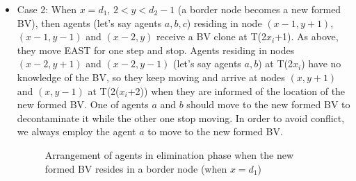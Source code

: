 \begin{itemize}
\item Case 2: When $x=d_1$, $2<y<d_2-1$ (a border node becomes a new formed BV), then agents (let's say agents $a,b,c$) residing in node $(x-1, y+1)$, $(x-1, y-1)$ and $(x-2, y)$ receive a BV clone at T(2$x_i$+1). As above, they move EAST for one step and stop. Agents residing in nodes $(x-2, y+1)$ and $(x-2, y-1)$ (let's say agents $a,b$) at T(2$x_i$) have no knowledge of the BV, so they keep moving and arrive at nodes $(x, y+1)$ and $(x, y-1)$ at T(2($x_i$+2)) when they are informed of the location of the new formed BV. One of agents $a$ and $b$ should move to the new formed BV to decontaminate it while the other one stop moving. In order to avoid conflict, we always employ the agent $a$ to move to the new formed BV.
\begin{figure} [H]
  \centering 
    \hspace{1in} 
    \caption{Arrangement of agents in elimination phase when the new formed BV resides in a border node (when $x=d_1$)} 
  \label{fig:subfigmesh2} %
\end{figure}


\end{itemize}
